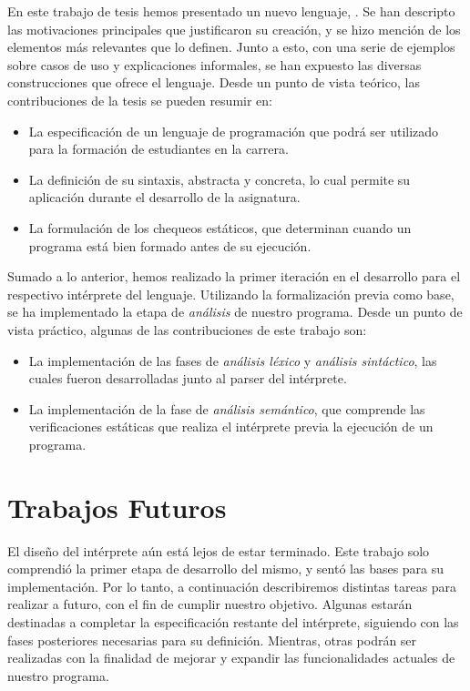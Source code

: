 En este trabajo de tesis hemos presentado un nuevo lenguaje, \Lenguaje{}.
Se han descripto las motivaciones principales que justificaron su creación, y se hizo mención de los elementos más relevantes que lo definen.
Junto a esto, con una serie de ejemplos sobre casos de uso y explicaciones informales, se han expuesto las diversas construcciones que ofrece el lenguaje.
Desde un punto de vista teórico, las contribuciones de la tesis se pueden resumir en:

\begin{itemize}
    \item La especificación de un lenguaje de programación que podrá ser utilizado para la formación de estudiantes en la carrera.
    \item La definición de su sintaxis, abstracta y concreta, lo cual permite su aplicación durante el desarrollo de la asignatura.
    \item La formulación de los chequeos estáticos, que determinan cuando un programa está bien formado antes de su ejecución.
\end{itemize}

Sumado a lo anterior, hemos realizado la primer iteración en el desarrollo para el respectivo intérprete del lenguaje.
Utilizando la formalización previa como base, se ha implementado la etapa de \textit{análisis} de nuestro programa.
Desde un punto de vista práctico, algunas de las contribuciones de este trabajo son:

\begin{itemize}
    \item La implementación de las fases de \textit{análisis léxico} y \textit{análisis sintáctico}, las cuales fueron desarrolladas junto al parser del intérprete.
    \item La implementación de la fase de \textit{análisis semántico}, que comprende las verificaciones estáticas que realiza el intérprete previa la ejecución de un programa.
\end{itemize}

\section{Trabajos Futuros}

El diseño del intérprete aún está lejos de estar terminado.
Este trabajo solo comprendió la primer etapa de desarrollo del mismo, y sentó las bases para su implementación.
Por lo tanto, a continuación describiremos distintas tareas para realizar a futuro, con el fin de cumplir nuestro objetivo.
Algunas estarán destinadas a completar la especificación restante del intérprete, siguiendo con las fases posteriores necesarias para su definición.
Mientras, otras podrán ser realizadas con la finalidad de mejorar y expandir las funcionalidades actuales de nuestro programa.

